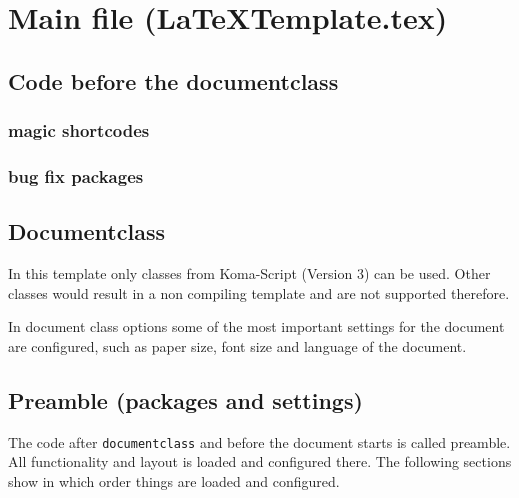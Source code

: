 \chapter{Main file (LaTeXTemplate.tex)}
\label{sec:doc:MainFile}

\section{Code before the documentclass}

\subsection{magic shortcodes}

\subsection{bug fix packages}

\section{Documentclass}
In this template only classes from Koma-Script (Version 3) can be used.
Other classes would result in a non compiling template and are not supported therefore. 

In document class options some of the most important settings for the document are configured, such as paper size, font size and language of the document.

\section{Preamble (packages and settings)}
The code after \texttt{documentclass} and before the document starts is called preamble. All functionality and layout is loaded and configured there. The following sections show in which order things are loaded and configured.

